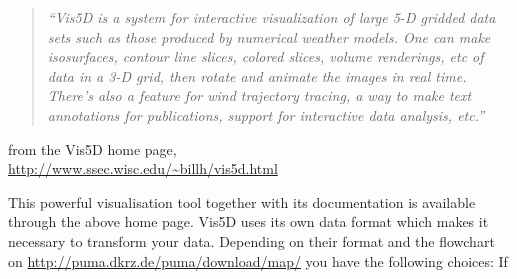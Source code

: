 \begin{quote}
{\it ``Vis5D is a system for interactive visualization of large 5-D
gridded data sets such as those produced by numerical weather
models. One can make isosurfaces, contour line slices, colored slices,
volume renderings, etc of data in a 3-D grid, then rotate and animate
the images in real time. There's also a feature for wind trajectory
tracing, a way to make text annotations for publications, support for
interactive data analysis, etc.''}
\par
\end{quote}
\begin{flushright}
from the Vis5D home page,\\
{\url{http://www.ssec.wisc.edu/~billh/vis5d.html}}
\end{flushright}
\par
\noindent This powerful visualisation tool together with its documentation is
available through the above home page. Vis5D uses its own data format
which makes it necessary to transform your data. Depending on their
format
 and the flowchart on
{\url{http://puma.dkrz.de/puma/download/map/}} you have the following
choices: If

